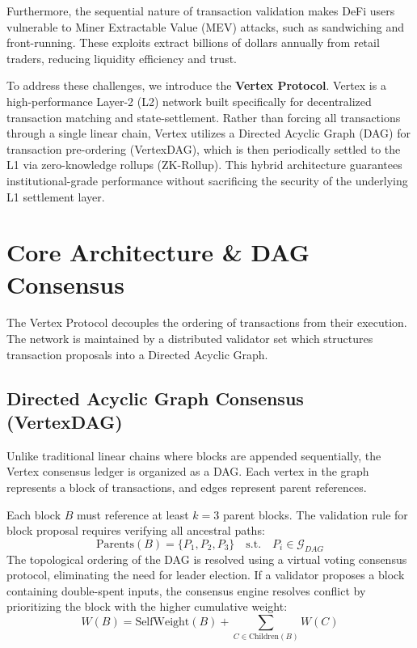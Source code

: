 \documentclass[10pt]{article}
\begin{document}
Furthermore, the sequential nature of transaction validation makes DeFi users vulnerable to Miner Extractable Value (MEV) attacks, such as sandwiching and front-running. These exploits extract billions of dollars annually from retail traders, reducing liquidity efficiency and trust.

To address these challenges, we introduce the \textbf{Vertex Protocol}. Vertex is a high-performance Layer-2 (L2) network built specifically for decentralized transaction matching and state-settlement. Rather than forcing all transactions through a single linear chain, Vertex utilizes a Directed Acyclic Graph (DAG) for transaction pre-ordering (VertexDAG), which is then periodically settled to the L1 via zero-knowledge rollups (ZK-Rollup). This hybrid architecture guarantees institutional-grade performance without sacrificing the security of the underlying L1 settlement layer.

\section{Core Architecture \& DAG Consensus}
The Vertex Protocol decouples the ordering of transactions from their execution. The network is maintained by a distributed validator set which structures transaction proposals into a Directed Acyclic Graph.

\subsection{Directed Acyclic Graph Consensus (VertexDAG)}
Unlike traditional linear chains where blocks are appended sequentially, the Vertex consensus ledger is organized as a DAG. Each vertex in the graph represents a block of transactions, and edges represent parent references.

Each block $B$ must reference at least $k = 3$ parent blocks. The validation rule for block proposal requires verifying all ancestral paths:
\begin{equation}
\text{Parents}(B) = \{P_1, P_2, P_3\} \quad \text{s.t.} \quad P_i \in \mathcal{G}_{DAG}
\end{equation}
The topological ordering of the DAG is resolved using a virtual voting consensus protocol, eliminating the need for leader election. If a validator proposes a block containing double-spent inputs, the consensus engine resolves conflict by prioritizing the block with the higher cumulative weight:
\begin{equation}
W(B) = \text{SelfWeight}(B) + \sum_{C \in \text{Children}(B)} W(C)
\end{equation}
\end{document}
